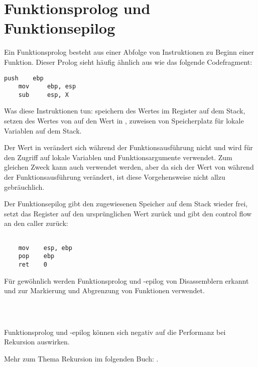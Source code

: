 \section{Funktionsprolog und Funktionsepilog}
\label{sec:prologepilog}

Ein Funktionsprolog besteht aus einer Abfolge von Instruktionen zu Beginn einer
Funktion. Dieser Prolog sieht häufig ähnlich aus wie das folgende Codefragment:

\begin{lstlisting}[style=customasm]
    push    ebp
    mov     ebp, esp
    sub     esp, X
\end{lstlisting}

Was diese Instruktionen tun: speichern des Wertes im \EBP Register auf dem
Stack, setzen des Wertes von \EBP auf den Wert in \ESP, zuweisen von Speicherplatz für lokale
Variablen auf dem Stack.

Der Wert in \EBP verändert sich während der Funktionsausführung nicht und wird
für den Zugriff auf lokale Variablen und Funktionsargumente verwendet. Zum
gleichen Zweck kann auch \ESP verwendet werden, aber da sich der Wert von \ESP
während der Funktionsausführung verändert, ist diese Vorgehensweise nicht allzu
gebräuchlich.

Der Funktionsepilog gibt den zugewiesenen Speicher auf dem Stack wieder frei,
setzt das \EBP Register auf den ursprünglichen Wert zurück und gibt den control
flow an den \gls{caller} zurück:

\begin{lstlisting}[style=customasm]

    mov    esp, ebp
    pop    ebp
    ret    0
\end{lstlisting}

Für gewöhnlich werden Funktionsprolog und -epilog von Disassemblern erkannt und
zur Markierung und Abgrenzung von Funktionen verwendet.

　
\subsection{\Rekursion}

\myindex{\Recursion}
Funktionsprolog und -epilog können sich negativ auf die Performanz bei Rekursion
auswirken. 

Mehr zum Thema Rekursion im folgenden Buch: .
